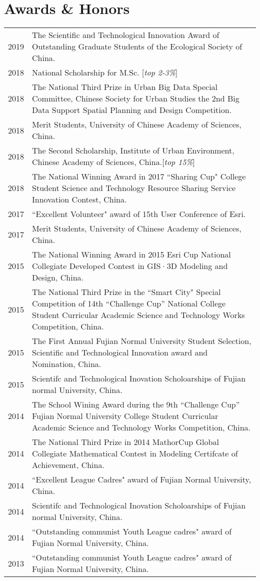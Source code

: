 \section*{Awards \& Honors}

\begin{tabular}{p{} p{}}
2019 & The Scientific and Technological Innovation Award of Outstanding Graduate Students of the Ecological Society of China. \\
2018 & National Scholarship for M.Sc. [\textit{top 2-3\%}] \\
2018 & The National Third Prize in Urban Big Data Special Committee, Chinese Society for Urban Studies the 2nd Big Data Support Spatial Planning and Design Competition. \\
2018 & Merit Students, University of Chinese Academy of Sciences, China.\\
2018 & The Second Scholarship, Institute of Urban Environment, Chinese Academy of Sciences, China.[\textit{top 15\%}] \\
2018 & The National Winning Award in 2017 ``Sharing Cup" College Student Science and Technology Resource Sharing Service Innovation Contest, China.\\
2017 & ``Excellent Volunteer" award of 15th User Conference of Esri. \\
2017 & Merit Students, University of Chinese Academy of Sciences, China. \\
2015 & The National Winning Award in 2015 Esri Cup National Collegiate Developed Contest in GIS·3D Modeling and Design, China.\\
2015 & The National Third Prize in the ``Smart City" Special Competition of 14th “Challenge Cup” National College Student Curricular Academic Science and Technology Works Competition, China.\\
2015 & The First Annual Fujian Normal University Student Selection, Scientific and Technological Innovation award and Nomination, China.\\
2015 & Scientifc and Technological Inovation Scholoarships of Fujian normal University, China.\\
2014 & The School Wining Award during the 9th “Challenge Cup” Fujian Normal University College Student Curricular Academic Science and Technology Works Competition, China.\\
2014 & The National Third Prize in 2014 MathorCup Global Collegiate Mathematical Contest in Modeling Certifcate of Achievement, China.\\
2014 & ``Excellent League Cadres" award of Fujian Normal University, China.\\
2014 & Scientifc and Technological Inovation Scholoarships of Fujian normal University, China.\\
2014 & ``Outstanding communist Youth League cadres" award of Fujian Normal University, China.\\
2013 & ``Outstanding communist Youth League cadres" award of Fujian Normal University, China.\\
\end{tabular}

